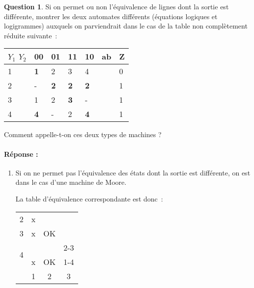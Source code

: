 \documentclass[11pt,a4paper]{article}
\theoremstyle{definition}%
\newtheorem{Q}{Question}[] %
\newcommand{\reponse}[1]{%
	\ifthenelse {\boolean{corrige}} {\paragraph{Réponse :} \color{darkblue}   #1\color{black}} {}
 }
\begin{document}
\begin{Q}
	Si on permet ou non l'équivalence de lignes dont la sortie est différente, montrer les deux automates différents (équations logiques et logigrammes) auxquels on parviendrait dans le cas de la table non complètement réduite suivante~:

	\begin{center}

	\begin{tabular}{|l|l|l|l|l|l|l|}
	\hline
	$Y_1$ $Y_2$ & 00         & 01         & 11         & 10         & ab & Z \\ \hline
	1           & \textbf{1} & 2          & 3          & 4          &    & 0 \\ \cline{1-5} \cline{7-7}
	2           & -          & \textbf{2} & \textbf{2} & \textbf{2} &    & 1 \\ \cline{1-5} \cline{7-7}
	3           & 1          & 2          & \textbf{3} & -          &    & 1 \\ \cline{1-5} \cline{7-7}
	4           & \textbf{4} & -          & 2          & \textbf{4} &    & 1 \\ \cline{1-5} \cline{7-7}
	\end{tabular}

	\end{center}

	Comment appelle-t-on ces deux types de machines ?

\reponse{
	\begin{enumerate}
		\item Si on ne permet pas l'équivalence des états dont la sortie est différente, on est dans le cas d'une machine de Moore.

		La table d'équivalence correspondante est donc~:
		\begin{center}
			\begin{tabular}{cccc} \cline{1-2}
				\multicolumn{1}{|c|}{2}	& 						\multicolumn{1}{c|}{\cellcolor{red!25}x} 					& 																	& \\ \cline{1-3}
				\multicolumn{1}{|c|}{3}	& 						\multicolumn{1}{c|}{\cellcolor{red!25}x} 					& \multicolumn{1}{c|}{\cellcolor{green!25}OK}						& \\ \cline{1-4}
				\multicolumn{1}{|c|}{\multirow{2}{*}{4}} & 		\multicolumn{1}{c|}{\cellcolor{red!25}}						& \multicolumn{1}{c|}{\cellcolor{green!25}} 						& \multicolumn{1}{c|}{\cellcolor{red!25}2-3}\\
				\multicolumn{1}{|c|}{} & 						\multicolumn{1}{c|}{\multirow{-2}{*}{\cellcolor{red!25}x}} & \multicolumn{1}{c|}{\multirow{-2}{*}{\cellcolor{green!25}OK}} 	& \multicolumn{1}{c|}{\cellcolor{red!25}1-4} \\ \cline{1-4}
			 & 													\multicolumn{1}{|c|}{1} & 									  \multicolumn{1}{c|}{2} 											& \multicolumn{1}{c|}{3} \\ \cline{2-4}
			\end{tabular}
		\end{center}


\end{enumerate}}
\end{Q}
\end{document}
